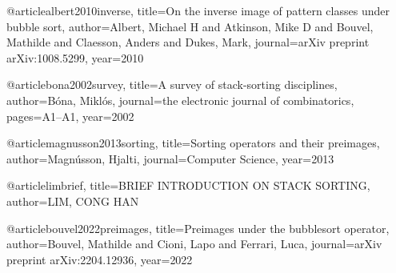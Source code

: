 
@article{albert2010inverse,
  title={On the inverse image of pattern classes under bubble sort},
  author={Albert, Michael H and Atkinson, Mike D and Bouvel, Mathilde and Claesson, Anders and Dukes, Mark},
  journal={arXiv preprint arXiv:1008.5299},
  year={2010}
}

@article{bona2002survey,
  title={A survey of stack-sorting disciplines},
  author={B{\'o}na, Mikl{\'o}s},
  journal={the electronic journal of combinatorics},
  pages={A1--A1},
  year={2002}
}

@article{magnusson2013sorting,
  title={Sorting operators and their preimages},
  author={Magn{\'u}sson, Hjalti},
  journal={Computer Science},
  year={2013}
}

@article{limbrief,
  title={BRIEF INTRODUCTION ON STACK SORTING},
  author={LIM, CONG HAN}
}

@article{bouvel2022preimages,
  title={Preimages under the bubblesort operator},
  author={Bouvel, Mathilde and Cioni, Lapo and Ferrari, Luca},
  journal={arXiv preprint arXiv:2204.12936},
  year={2022}
}
